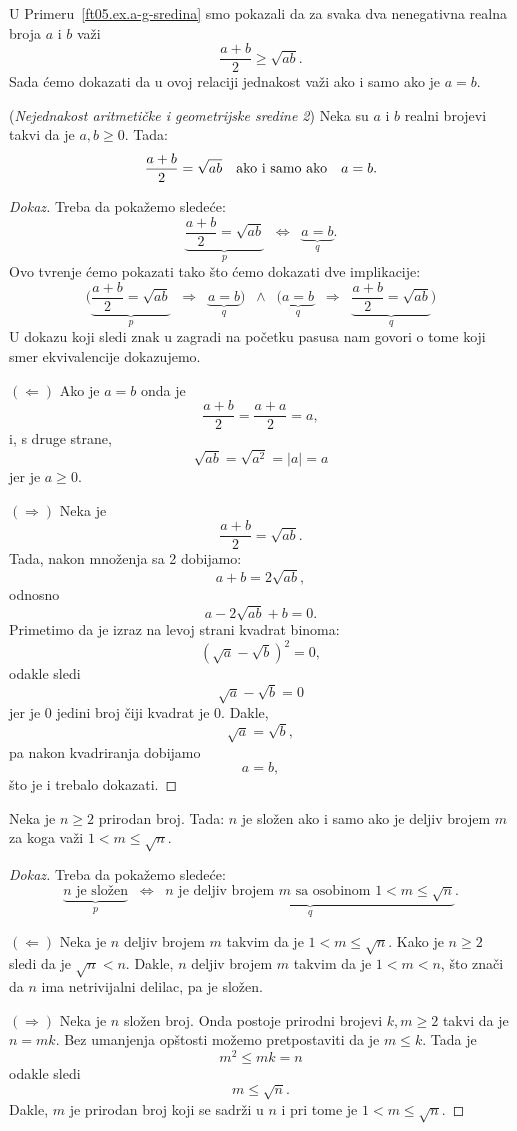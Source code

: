 U Primeru~\ref{ft05.ex.a-g-sredina} smo pokazali da za svaka dva nenegativna realna broja $a$ i $b$ va\v zi
$$
  \frac{a + b}{2} \ge \sqrt{ab}.
$$
Sada \'cemo dokazati da u ovoj relaciji jednakost va\v zi ako i samo ako je $a = b$.

\begin{EX} (\emph{Nejednakost aritmeti\v cke i geometrijske sredine 2})
  Neka su $a$ i $b$ realni brojevi takvi da je $a, b \ge 0$. Tada:
  $$
    \frac{a+b}{2} = \sqrt{ab} \text{\quad ako i samo ako\quad} a = b.
  $$
\end{EX}
\begin{proof}[Dokaz]
  Treba da poka\v zemo slede\'ce:
  $$
    \underbrace{\frac{a+b}{2} = \sqrt{ab}}_p \;\;\Leftrightarrow\;\; \underbrace{a = b}_q.
  $$
  Ovo tvr\dj enje \'cemo pokazati tako \v sto \'cemo dokazati dve implikacije:
  $$
    \bigg(\underbrace{\frac{a+b}{2} = \sqrt{ab}}_p \;\;\Rightarrow\;\; \underbrace{a = b}_q\bigg)
    \;\;\land\;\;
    \bigg(\underbrace{a = b}_q \;\;\Rightarrow\;\; \underbrace{\frac{a+b}{2} = \sqrt{ab}}_q\bigg)
  $$
  U dokazu koji sledi znak u zagradi na po\v cetku pasusa nam govori o tome koji smer ekvivalencije dokazujemo.

  $(\Leftarrow)$ Ako je $a = b$ onda je
  $$
    \frac{a+b}{2} = \frac{a + a}{2} = a,
  $$
  i, s druge strane,
  $$
    \sqrt{ab} = \sqrt{a^2} = |a| = a
  $$
  jer je $a \ge 0$.
  
  \medskip
  
  $(\Rightarrow)$
  Neka je
  $$
    \frac{a+b}{2} = \sqrt{ab}.
  $$
  Tada, nakon mno\v zenja sa 2 dobijamo:
  $$
    a + b = 2 \sqrt{ab},
  $$
  odnosno
  $$
    a - 2 \sqrt{ab} + b = 0.
  $$
  Primetimo da je izraz na levoj strani kvadrat binoma:
  $$
    (\sqrt a - \sqrt b)^2 = 0,
  $$
  odakle sledi
  $$
    \sqrt a - \sqrt b = 0
  $$
  jer je 0 jedini broj \v ciji kvadrat je 0. Dakle,
  $$
    \sqrt a = \sqrt b,
  $$
  pa nakon kvadriranja dobijamo
  $$
    a = b,
  $$
  \v sto je i trebalo dokazati.
\end{proof}

\begin{EX}
  Neka je $n \ge 2$ prirodan broj.
  Tada: $n$ je slo\v zen ako i samo ako je deljiv brojem $m$ za koga va\v zi $1 < m \le \sqrt n$.
\end{EX}
\begin{proof}[Dokaz]
  Treba da poka\v zemo slede\'ce:
  $$
    \underbrace{n \text{\ \ je slo\v zen}}_p \;\;\Leftrightarrow\;\; \underbrace{n \text{\ \ je deljiv brojem $m$ sa osobinom\ \ } 1 < m \le \sqrt n}_q.
  $$

  $(\Leftarrow)$
  Neka je $n$ deljiv brojem $m$ takvim da je $1 < m \le \sqrt n$. Kako je $n \ge 2$ sledi da je $\sqrt n < n$.
  Dakle, $n$ deljiv brojem $m$ takvim da je $1 < m < n$, \v sto zna\v ci da $n$ ima netrivijalni delilac, pa je slo\v zen.
  
  $(\Rightarrow)$
  Neka je $n$ slo\v zen broj. Onda postoje prirodni brojevi $k, m \ge 2$ takvi da je $n = mk$. Bez umanjenja op\v stosti
  mo\v zemo pretpostaviti da je $m \le k$. Tada je
  $$
    m^2 \le mk = n
  $$
  odakle sledi
  $$
    m \le \sqrt n.
  $$
  Dakle, $m$ je prirodan broj koji se sadr\v zi u $n$ i pri tome je $1 < m \le \sqrt n$.
\end{proof}

